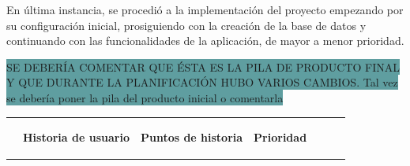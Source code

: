 \documentclass[pdftex,11pt,a4paper]{book}
\begin{document}
En última instancia, se procedió a la implementación del proyecto empezando por su configuración inicial, prosiguiendo con la creación de la base de datos y continuando con las funcionalidades de la aplicación, de mayor a menor prioridad.

\colorbox{CadetBlue}{SE DEBERÍA COMENTAR QUE ÉSTA ES LA PILA DE PRODUCTO FINAL Y QUE DURANTE LA PLANIFICACIÓN HUBO VARIOS CAMBIOS. Tal vez se debería poner la pila del producto inicial o comentarla}

\renewcommand{\tablename}{Tabla}

\renewcommand{\arraystretch}{1,7}

\begin{center}
\begin{longtable}{|>{\centering\arraybackslash}X m{}|m{}|>{\centering\arraybackslash}X m{}|>{\centering\arraybackslash}X m{}|}
\hline
{\centering \textbf{Código}} &
{\centering \begin{center} \textbf{Historia de usuario}\end{center}} &
{\textbf{Puntos de historia}} &
{\textbf{Prioridad}} &
\hline 
\endhead


\end{longtable}
\end{center}
\end{document}
